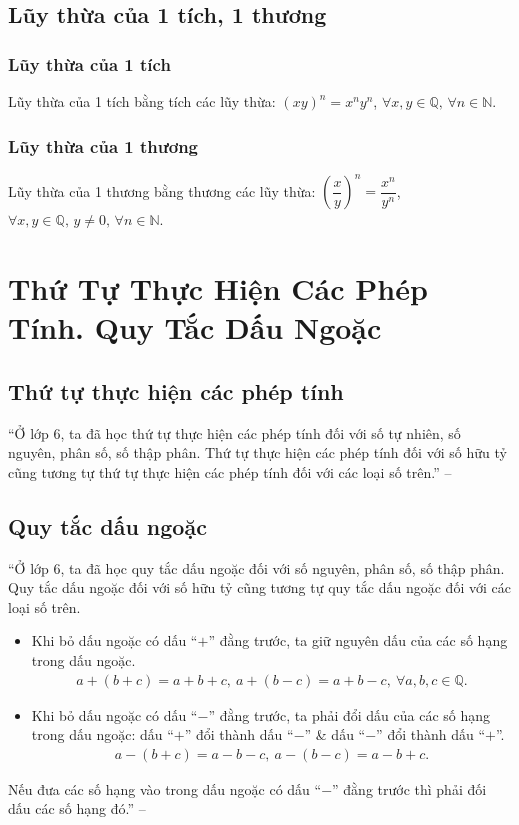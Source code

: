 \documentclass[oneside]{book}
\numberwithin{equation}{section}
\begin{document}
\subsection{Lũy thừa của 1 tích, 1 thương}

\subsubsection{Lũy thừa của 1 tích}
Lũy thừa của 1 tích bằng tích các lũy thừa: $(xy)^n = x^ny^n$, $\forall x,y\in\mathbb{Q},\,\forall n\in\mathbb{N}$.

\subsubsection{Lũy thừa của 1 thương}
Lũy thừa của 1 thương bằng thương các lũy thừa: $\left(\dfrac{x}{y}\right)^n = \dfrac{x^n}{y^n}$, $\forall x,y\in\mathbb{Q},\,y\ne 0,\,\forall n\in\mathbb{N}$.

\section{Thứ Tự Thực Hiện Các Phép Tính. Quy Tắc Dấu Ngoặc}

\subsection{Thứ tự thực hiện các phép tính}
``Ở lớp 6, ta đã học thứ tự thực hiện các phép tính đối với số tự nhiên, số nguyên, phân số, số thập phân. Thứ tự thực hiện các phép tính đối với số hữu tỷ cũng tương tự thứ tự thực hiện các phép tính đối với các loại số trên.'' -- \cite[p. 23]{SGK_Toan_7_Canh_Dieu_tap_1}

\subsection{Quy tắc dấu ngoặc}
``Ở lớp 6, ta đã học quy tắc dấu ngoặc đối với số nguyên, phân số, số thập phân. Quy tắc dấu ngoặc đối với số hữu tỷ cũng tương tự quy tắc dấu ngoặc đối với các loại số trên.
\begin{itemize}
	\item Khi bỏ dấu ngoặc có dấu ``$+$'' đằng trước, ta giữ nguyên dấu của các số hạng trong dấu ngoặc.
	\begin{align*}
		a + (b + c) = a + b + c,\ a + (b - c) = a + b - c,\ \forall a,b,c\in\mathbb{Q}.
	\end{align*}
	\item Khi bỏ dấu ngoặc có dấu ``$-$'' đằng trước, ta phải đổi dấu của các số hạng trong dấu ngoặc: dấu ``$+$'' đổi thành dấu ``$-$'' \& dấu ``$-$'' đổi thành dấu ``$+$''.
	\begin{align*}
		a - (b + c) = a - b - c,\ a - (b - c) = a - b + c.
	\end{align*}
\end{itemize}
Nếu đưa các số hạng vào trong dấu ngoặc có dấu ``$-$'' đằng trước thì phải đối dấu các số hạng đó.'' -- \cite[p. 24]{SGK_Toan_7_Canh_Dieu_tap_1}
\end{document}
